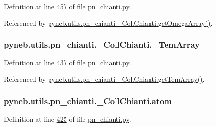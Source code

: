 Definition at line \hyperlink{pn__chianti_8py_source_l00457}{457} of file \hyperlink{pn__chianti_8py_source}{pn\-\_\-chianti.\-py}.



Referenced by \hyperlink{pn__chianti_8py_source_l00484}{pyneb.\-utils.\-pn\-\_\-chianti.\-\_\-\-Coll\-Chianti.\-get\-Omega\-Array()}.

\hypertarget{classpyneb_1_1utils_1_1pn__chianti_1_1___coll_chianti_a7dc1ede29c8b436a27a20203cdb87f49}{
\subsubsection[{\-\_\-\-Tem\-Array}]{\setlength{\rightskip}{0pt plus 5cm}pyneb.\-utils.\-pn\-\_\-chianti.\-\_\-\-Coll\-Chianti.\-\_\-\-Tem\-Array\hspace{0.3cm}{\ttfamily [private]}}}\label{classpyneb_1_1utils_1_1pn__chianti_1_1___coll_chianti_a7dc1ede29c8b436a27a20203cdb87f49}


Definition at line \hyperlink{pn__chianti_8py_source_l00437}{437} of file \hyperlink{pn__chianti_8py_source}{pn\-\_\-chianti.\-py}.



Referenced by \hyperlink{pn__chianti_8py_source_l00551}{pyneb.\-utils.\-pn\-\_\-chianti.\-\_\-\-Coll\-Chianti.\-get\-Tem\-Array()}.

\hypertarget{classpyneb_1_1utils_1_1pn__chianti_1_1___coll_chianti_a904418982790fd63f2324fec90636bb6}{
\subsubsection[{atom}]{\setlength{\rightskip}{0pt plus 5cm}pyneb.\-utils.\-pn\-\_\-chianti.\-\_\-\-Coll\-Chianti.\-atom}}\label{classpyneb_1_1utils_1_1pn__chianti_1_1___coll_chianti_a904418982790fd63f2324fec90636bb6}


Definition at line \hyperlink{pn__chianti_8py_source_l00425}{425} of file \hyperlink{pn__chianti_8py_source}{pn\-\_\-chianti.\-py}.



